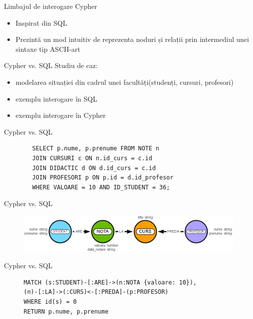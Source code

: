 \documentclass{beamer}
\begin{document}
\begin{frame}{Limbajul de interogare Cypher}
    \begin{itemize}
        \item Inspirat din SQL
        \item Prezintă un mod intuitiv de reprezenta noduri și relații prin intermediul unei sintaxe tip ASCII-art
    \end{itemize}
\end{frame}

\begin{frame}{Cypher vs. SQL}
    Studiu de caz:
    \begin{itemize}
        \item modelarea situației din cadrul unei facultăți(studenți, cursuri, profesori)
        \item exemplu interogare în SQL
        \item exemplu interogare în Cypher
    \end{itemize}
\end{frame}


\begin{frame}[fragile]{Cypher vs. SQL}
    \centering
    \begin{BVerbatim}
        SELECT p.nume, p.prenume FROM NOTE n 
        JOIN CURSURI c ON n.id_curs = c.id
        JOIN DIDACTIC d ON d.id_curs = c.id
        JOIN PROFESORI p ON p.id = d.id_profesor
        WHERE VALOARE = 10 AND ID_STUDENT = 36;
    \end{BVerbatim}
\end{frame}

\begin{frame}[fragile]{Cypher vs. SQL}
    \begin{figure}[H]
        \centering
        \begin{adjustbox}{max size={\textwidth}{\textheight}}
        \includegraphics[scale = 0.4]{exemplu_2}
        \end{adjustbox}
    \end{figure}
\end{frame}

\begin{frame}[fragile]{Cypher vs. SQL}
    \centering
    \begin{figure}[H]
\centering
\begin{BVerbatim}
MATCH (s:STUDENT)-[:ARE]->(n:NOTA {valoare: 10}),
(n)-[:LA]->(:CURS)<-[:PREDA]-(p:PROFESOR)
WHERE id(s) = 0
RETURN p.nume, p.prenume
\end{BVerbatim}
\end{figure}
\end{frame}
\end{document}
